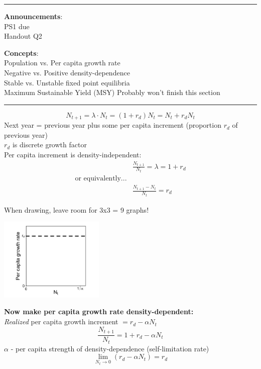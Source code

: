 \documentclass{article}
\newcommand{\note}[1]{\colorbox{gray!30}{#1}}
\newcommand{\ind}{\-\hspace{1cm}}
\begin{document}
\noindent{}

\rule[0.5ex]{\linewidth}{1pt}
\textbf{Announcements}: \\
	\ind PS1 due\\
	\ind Handout Q2

\textbf{Concepts}: \\
	\ind Population vs. Per capita growth rate \\
	\ind Negative vs. Positive density-dependence \\
	\ind Stable vs. Unstable fixed point equilibria \\
	\ind Maximum Sustainable Yield (MSY) \note{Probably won't finish this section}\\
\rule[0.5ex]{\linewidth}{1pt}

\begin{equation*}
	N_{t+1}=\lambda \cdot N_t = (1+r_d) N_t = N_t + r_d N_t
\end{equation*}
	Next year = previous year plus some per capita increment (proportion $r_d$ of previous year)\\
\ind	$r_d$ is discrete growth factor\\
		
Per capita increment is density-independent:
\begin{align*}
&	\frac{N_{t+1}}{N_t}=\lambda = 1+r_d \\
	\text{or equivalently...}&\\
&	\frac{N_{t+1}-N_t}{N_t}=r_d
\end{align*}

\note{When drawing, leave room for 3x3 = 9 graphs!}
\begin{center}
\includegraphics[width=5cm]{figs/percap.jpg}
\end{center}

\textbf{Now make per capita growth rate density-dependent:}\\
\emph{Realized} per capita growth increment $=r_d-\alpha N_t$
\begin{equation*}
	\frac{N_{t+1}}{N_t}=1+r_d-\alpha N_t
\end{equation*}
\ind $\alpha$ - per capita strength of density-dependence (self-limitation rate)\\
\begin{equation*}
\lim_{N_t \to 0} (r_d-\alpha N_t)=r_d
\end{equation*}
\end{document}
